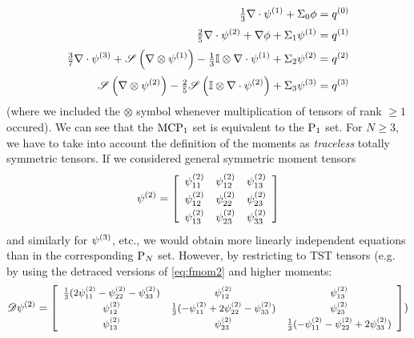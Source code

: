 \begin{equation}\label{eq:MCP3}
	\begin{aligned}
    \tfrac{1}{3}\nabla\cdot\fmom[1] 
      +   {\Sigma}_{0}\phi
      &=  {q}^{(0)} \\[.2em]
    \tfrac{2}{5} \nabla\cdot\fmom[2] + \nabla\phi 
      +   {\Sigma}_{1}\fmom[1] 
      &=  {q}^{(1)}  \\[.2em]
    \tfrac{3}{7} \nabla\cdot\fmom[3] + \Sym{\nabla\otimes\fmom[1]} - \tfrac{1}{3} \eye\otimes\nabla\cdot\fmom[1]
      +   {\Sigma}_{2}\fmom[2]
      &=  {q}^{(2)}  \\[.2em]
                                       \Sym{\nabla\otimes\fmom[2]} - \tfrac{2}{5} \Sym{\eye\otimes\nabla\cdot\fmom[2]}
      +   {\Sigma}_{3}\fmom[3]
      &=  {q}^{(3)}
    \end{aligned}
\end{equation}
(where we included the $\otimes$
symbol whenever multiplication of tensors of rank $\geq 1$ occured).
We can see that the $\MCPN[1]$ set is equivalent to the $\PN[1]$ set. For $N \geq 3$, we have to take into account the
definition of the moments as \textit{traceless} totally symmetric tensors. If we considered general symmetric
moment tensors 
\begin{equation}\label{eq:fmom2}
	\fmom[2] = \left[
\begin{array}{ccc}
 \fmom[2]_{11} & \fmom[2]_{12} & \fmom[2]_{13} \\[.2em]
 \fmom[2]_{12} & \fmom[2]_{22} & \fmom[2]_{23} \\[.2em]
 \fmom[2]_{13} & \fmom[2]_{23} & \fmom[2]_{33} \\
\end{array}
\right]
\end{equation}
and similarly for $\fmom[3]$, etc., we would obtain more linearly independent equations than in the corresponding $\PN$
set. However, by restricting to TST tensors (e.g. by using the detraced versions of \eqref{eq:fmom2} and higher moments:
$$
\footnotesize
\detr\fmom[2] = \left[
\begin{array}{ccc}
 \frac{1}{3} (2 \fmom[2]_{11}-\fmom[2]_{22}-\fmom[2]_{33}) & \fmom[2]_{12} & \fmom[2]_{13} \\[.2em]
 \fmom[2]_{12} & \frac{1}{3} (-\fmom[2]_{11}+2 \fmom[2]_{22}-\fmom[2]_{33}) & \fmom[2]_{23} \\[.2em]
 \fmom[2]_{13} & \fmom[2]_{23} & \frac{1}{3} (-\fmom[2]_{11}-\fmom[2]_{22}+2 \fmom[2]_{33}) \\
\end{array}
\right])
$$
